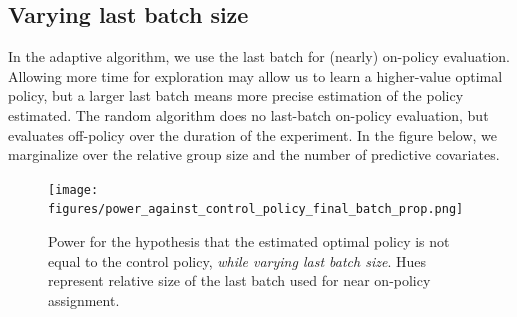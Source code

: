 \documentclass[letterpaper, 12pt, parskip=full,]{scrartcl}
\begin{document}
\subsection{Varying last batch size}
In the adaptive algorithm, we use the last batch for (nearly) on-policy evaluation. Allowing more time for exploration may allow us to learn a higher-value optimal policy, but a larger last batch means more precise estimation of the policy estimated. The random algorithm does no last-batch on-policy evaluation, but evaluates off-policy over the duration of the experiment. In the figure below, we marginalize over the relative group size and the number of predictive covariates. 

\begin{figure}[H]
\centering
\texttt{[image: figures/power\_against\_control\_policy\_final\_batch\_prop.png]}
\caption{Power for the hypothesis that the estimated optimal policy is not equal to the control policy, \textit{while varying last batch size}. Hues represent relative size of the last batch used for near on-policy assignment. }
\label{fig:power_control_final_batch_prop}
\end{figure}

%
%
\end{document}
